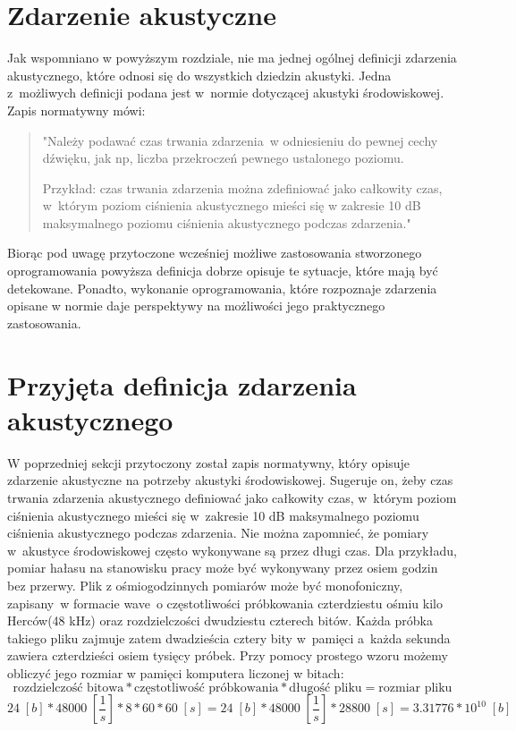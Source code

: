 \documentclass[eng,printmode]{mgr}
\begin{document}
\section{Zdarzenie akustyczne}
Jak wspomniano w powyższym rozdziale, nie ma jednej ogólnej definicji zdarzenia akustycznego, które odnosi się do wszystkich dziedzin akustyki. Jedna z~możliwych definicji podana jest w~normie \cite{PN-ISO-1996-1:2006} dotyczącej akustyki środowiskowej. Zapis normatywny mówi:

\begin{quotation}
"Należy podawać czas trwania zdarzenia~w odniesieniu do pewnej cechy dźwięku, jak np, liczba przekroczeń pewnego ustalonego poziomu. 

Przykład: czas trwania zdarzenia można zdefiniować jako całkowity czas, w~którym poziom ciśnienia akustycznego mieści się w zakresie 10 dB maksymalnego poziomu ciśnienia akustycznego podczas zdarzenia."\cite{PN-ISO-1996-1:2006}
\end{quotation}

Biorąc pod uwagę przytoczone wcześniej możliwe zastosowania stworzonego oprogramowania powyższa definicja dobrze opisuje te sytuacje, które mają być detekowane. Ponadto, wykonanie oprogramowania, które rozpoznaje zdarzenia opisane w normie daje perspektywy na możliwości jego praktycznego zastosowania.
\section{Przyjęta definicja zdarzenia akustycznego}
W poprzedniej sekcji przytoczony został zapis normatywny, który opisuje zdarzenie akustyczne na potrzeby akustyki środowiskowej. Sugeruje on, żeby czas trwania zdarzenia akustycznego definiować jako całkowity czas, w~którym poziom ciśnienia akustycznego mieści się w~zakresie 10 dB maksymalnego poziomu ciśnienia akustycznego podczas zdarzenia. 
Nie można zapomnieć, że pomiary w~akustyce środowiskowej często wykonywane są przez długi czas. Dla przykładu, pomiar hałasu na stanowisku pracy może być wykonywany przez osiem godzin bez przerwy\cite{PN-ISO-9612:2014}. Plik z ośmiogodzinnych pomiarów może być monofoniczny, zapisany~w formacie wave~o częstotliwości próbkowania czterdziestu ośmiu kilo Herców(48 kHz) oraz rozdzielczości dwudziestu czterech bitów. Każda próbka takiego pliku zajmuje zatem dwadzieścia cztery bity w~pamięci a~każda sekunda zawiera czterdzieści osiem tysięcy próbek.\cite{Principles_of_digital_audio} Przy pomocy prostego wzoru możemy obliczyć jego rozmiar w pamięci komputera liczonej w bitach:
\begin{equation}
\text{rozdzielczość bitowa} * \text{częstotliwość próbkowania} * \text{długość pliku} = \text{rozmiar pliku}
\end{equation}
\begin{equation}
24\;[b] * 48000\;[\frac{1}{s}] * 8*60*60\;[s] = 24\;[b] * 48000 \;[\frac{1}{s}] * 28800\;[s] = 3.31776*10^{10} \;[b] 
\end{equation}
\end{document}
